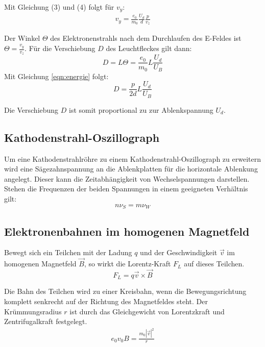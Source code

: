 Mit Gleichung (3) und (4) folgt für $v_y$:
\begin{align}
  v_y = \frac{e_0}{m_0} \frac{U_d}{d} \frac{p}{v_z}
\end{align}

Der Winkel $\Theta$ des Elektronenstrahls nach dem Durchlaufen des E-Feldes ist $\Theta = \frac{v_y}{v_z}$.
Für die Verschiebung $D$ des Leuchtfleckes gilt dann:
\begin{equation}
  D = L \Theta = \frac{e_0}{m_0} L \frac{U_d}{U_B}
\end{equation}
 Mit Gleichung \eqref{eqn:energie} folgt:
\begin{equation}
  D = \frac{p}{2d} L \frac{U_d}{U_B}
\end{equation}

Die Verschiebung $D$ ist somit proportional zu zur Ablenkspannung $U_d$.

\subsection{Kathodenstrahl-Oszillograph}

Um eine Kathodenstrahlröhre zu einem Kathodenstrahl-Oszillograph zu erweitern wird eine
Sägezahnspannung an die Ablenkplatten für die horizontale Ablenkung angelegt. Dieser
kann die Zeitabhängigkeit von Wechselspannungen darstellen.
Stehen die Frequenzen der beiden Spannungen in einem geeigneten Verhältnis gilt:
\begin{equation}
  n \nu_S = m \nu_W
\end{equation}


\subsection{Elektronenbahnen im homogenen Magnetfeld}

Bewegt sich ein Teilchen mit der Ladung $q$ und der Geschwindigkeit $\vec{v}$ im homogenen Magnetfeld $\vec{B}$, so
wirkt die Lorentz-Kraft $F_L$ auf dieses Teilchen.
\begin{equation}
  F_L = q \vec{v} \times \vec{B}
\end{equation}

Die Bahn des Teilchen wird zu einer Kreisbahn, wenn die Bewegungsrichtung komplett senkrecht auf der
Richtung des Magnetfeldes steht.
Der Krümmungsradius $r$ ist durch das Gleichgewicht von Lorentzkraft und Zentrifugalkraft festgelegt.
\begin{align}
  e_0 v_0 B = \frac{m_0 | \vec{v} |^2}{r}
\end{align}

